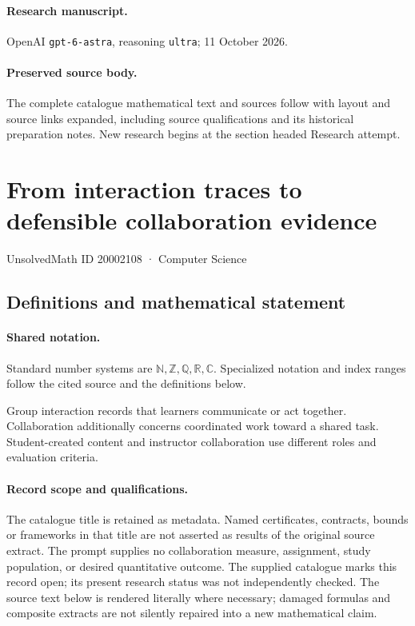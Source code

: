 \documentclass[11pt]{article}
\begin{document}
\paragraph{Research manuscript.} OpenAI \texttt{gpt-6-astra}, reasoning \texttt{ultra}; 11 October 2026.
\paragraph{Preserved source body.} The complete catalogue mathematical text and sources follow with layout and source links expanded, including source qualifications and its historical preparation notes. New research begins at the section headed Research attempt.

\section{From interaction traces to defensible collaboration evidence}\label{20002108}
{\small UnsolvedMath ID 20002108 · Computer Science}
\subsection{Definitions and mathematical statement}

\paragraph{Shared notation.}Standard number systems are $\mathbb N,\mathbb Z,\mathbb Q,\mathbb R,\mathbb C$. Specialized notation and index ranges follow the cited source and the definitions below.


Group interaction records that learners communicate or act together. Collaboration additionally concerns coordinated work toward a shared task. Student-created content and instructor collaboration use different roles and evaluation criteria.
\paragraph{Record scope and qualifications.}
The catalogue title is retained as metadata. Named certificates, contracts, bounds or frameworks in that title are not asserted as results of the original source extract.
The prompt supplies no collaboration measure, assignment, study population, or desired quantitative outcome. The supplied catalogue marks this record open; its present research status was not independently checked.
The source text below is rendered literally where necessary; damaged formulas and composite extracts are not silently repaired into a new mathematical claim.
\end{document}
